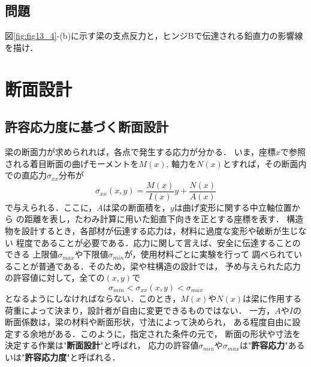 \documentclass[10pt,a4j]{jbook}
\begin{document}
\subsection{問題}
図\ref{fig:fig13_4}-(b)に示す梁の支点反力と，ヒンジBで伝達される鉛直力の影響線を描け．
\section{断面設計}
\subsection{許容応力度に基づく断面設計}
梁の断面力が求められれば，各点で発生する応力が分かる．
いま，座標$x$で参照される着目断面の曲げモーメントを$M(x)$, 
軸力を$N(x)$とすれば，その断面内での直応力$\sigma_{xx}$分布が
\begin{equation}
	\sigma_{xx}(x,y)=\frac{M(x)}{I(x)}y+\frac{N(x)}{A(x)}
\end{equation}
で与えられる．ここに，$A$は梁の断面積を，$y$は曲げ変形に関する中立軸位置から
の距離を表し，たわみ計算に用いた鉛直下向きを正とする座標を表す．
構造物を設計するとき，各部材が伝達する応力は，材料に過度な変形や破断が生じない
程度であることが必要である．応力に関して言えば、安全に伝達することのできる
上限値$\sigma_{max}$や下限値$\sigma_{min}$が，使用材料ごとに実験を行って
調べられていることが普通である．そのため，梁や柱構造の設計では，
予め与えられた応力の許容値に対して，全ての$(x,y)$で
\begin{equation}
	\sigma_{min}< \sigma_{xx}(x,y) < \sigma_{max}
	\label{eqn:sxx_siga}
\end{equation}
となるようにしなければならない．このとき，$M(x)$や$N(x)$は梁に作用する
荷重によって決まり，設計者が自由に変更できるものではない．
一方，$A$や$I$の断面係数は，梁の材料や断面形状，寸法によって決められ，
ある程度自由に設定する余地がある．このように，指定された条件の元で，
断面の形状や寸法を決定する作業は"{\bf 断面設計}"と呼ばれ，
応力の許容値$\sigma_{min}$や$\sigma_{max}$は"{\bf 許容応力}"あるいは"{\bf 許容応力度}"と呼ばれる．
\end{document}

